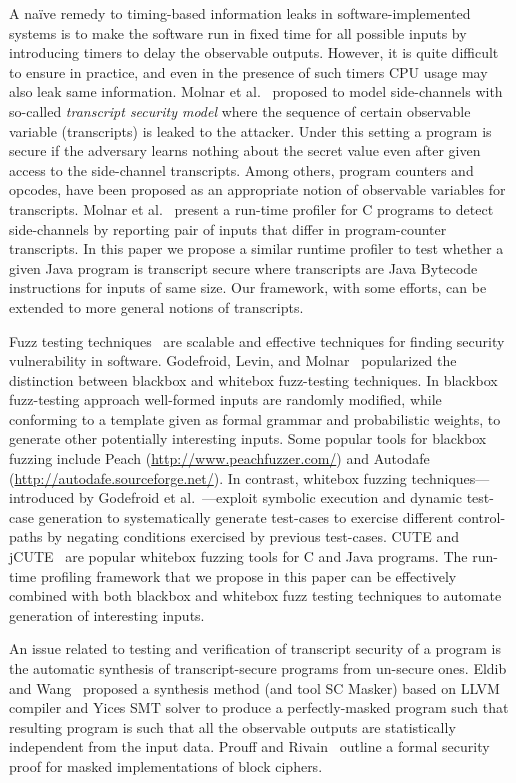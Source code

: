 A na\"ive remedy to timing-based information leaks in software-implemented
systems is to make the software run in fixed time for all possible inputs by
introducing timers to delay the observable outputs. 
However, it is quite difficult to ensure in practice, and even in the presence
of such timers CPU usage may also leak same information.
Molnar et al.~\cite{Molnar05} proposed to model side-channels with
so-called \emph{transcript security model} where the sequence of certain
observable variable (transcripts) is leaked to the attacker.
Under this setting a program is secure if the adversary learns nothing about the
secret value even after given access to the side-channel transcripts.
Among others, program counters and opcodes, have been proposed as an appropriate
notion of observable variables for transcripts.
Molnar et al.~\cite{Molnar05} present a run-time profiler for C programs to
detect side-channels by reporting pair of inputs that differ in program-counter
transcripts.  
In this paper we propose a similar runtime profiler to test whether a given
Java program is transcript secure where transcripts are Java Bytecode
instructions for inputs of same size.
Our framework, with some efforts, can be extended to more general notions of
transcripts.

Fuzz testing techniques~\cite{God12} are scalable and effective techniques for finding security
vulnerability in software.
Godefroid, Levin, and Molnar~\cite{God12} popularized the distinction between
blackbox and whitebox fuzz-testing techniques.
In blackbox fuzz-testing approach well-formed inputs are randomly modified,
while conforming to a template given as formal grammar and probabilistic
weights, to generate other potentially interesting inputs.  
Some popular tools for blackbox fuzzing include Peach 
(\url{http://www.peachfuzzer.com/}) and Autodafe
(\url{http://autodafe.sourceforge.net/}).
In contrast, whitebox fuzzing techniques---introduced by Godefroid et
al.~\cite{God12,GKS05}---exploit symbolic execution and dynamic test-case generation
to systematically generate test-cases to exercise different control-paths by
negating conditions exercised by previous test-cases.
CUTE and jCUTE~\cite{Sen2006} are popular whitebox fuzzing tools for C and Java
programs. 
The run-time profiling framework that we propose in this paper can be
effectively combined with both blackbox and whitebox fuzz testing techniques to
automate generation of interesting inputs.

An issue related to testing and verification of transcript security of a program
is the automatic synthesis of transcript-secure programs from un-secure ones.
Eldib and Wang~\cite{EW14} proposed a synthesis method (and tool SC Masker)
based on LLVM compiler and Yices SMT solver to produce a perfectly-masked
program such that resulting program is such that all the observable outputs are
statistically independent from the input data. 
Prouff and Rivain~\cite{PR13} outline a formal security proof for masked
implementations of block ciphers.      


